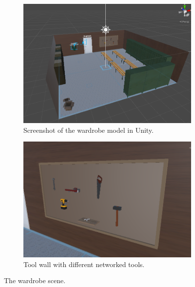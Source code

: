 \begin{figure}[H]
  \centering
  \begin{subfigure}[b]{0.47\textwidth}
    \includegraphics[width=1\textwidth]{fig/phase_2/implementation/wardrobe.PNG}
    \caption{Screenshot of the wardrobe model in Unity.}
    \label{fig:wardrobeApp}
  \end{subfigure}
  \hfill%
  \begin{subfigure}[b]{0.47\textwidth}
    \includegraphics[width=1\textwidth]{fig/phase_2/implementation/toolsWall.PNG}
    \caption{Tool wall with different networked tools.}
    \label{fig:toolWall}
  \end{subfigure}
  \hfill%
  \caption{The wardrobe scene.}
  \label{fig:phase2Wardrobe}
\end{figure}



